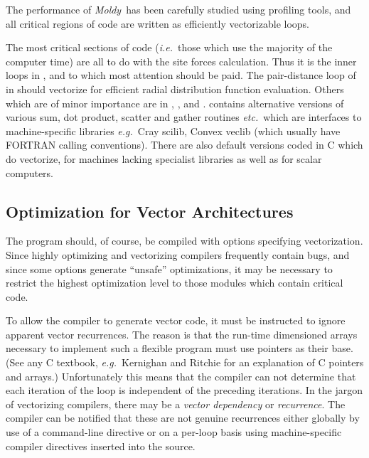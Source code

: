 \documentclass[a4paper,twoside]{report}
\newcommand{\moldy}{\emph{Moldy}}
\newcommand{\etc}{\emph{etc.}}
\newcommand{\eg}{\emph{e.g.}}
\newcommand{\ie}{\emph{i.e.}}
\begin{document}
The performance of \moldy\  has been carefully studied using profiling
tools, and all critical regions of code are written as efficiently
vectorizable loops.  

The most critical sections of code (\ie\ those which use the majority
of the computer time) are all to do with the site forces calculation.
Thus it is the inner loops in ,  and
 to which most attention should be paid.  The
pair-distance loop of  in  should
vectorize for efficient radial distribution function evaluation.
Others which are of minor importance are in ,
,  and .
 contains alternative versions of various sum, dot
product, scatter and gather routines \etc\ which are interfaces to
machine-specific libraries \eg\ Cray scilib, Convex veclib (which
usually have FORTRAN calling conventions). There are also default
versions coded in C which do vectorize, for machines lacking
specialist libraries as well as for scalar computers.

\subsection{Optimization for Vector Architectures}
The program should, of course, be compiled with options specifying
vectorization.   Since highly
optimizing and vectorizing compilers frequently contain bugs, and
since some options generate ``unsafe'' optimizations, it may be
necessary to restrict the highest optimization level to those modules
which contain critical code.

To allow the compiler to generate vector code, it must be instructed
to ignore apparent vector recurrences. The reason is that the run-time
dimensioned arrays necessary to implement such a flexible program must
use pointers as their base.  (See any C textbook, \eg\ Kernighan and
Ritchie\cite[Chapter 5]{kernighan:88} for an explanation of C pointers and
arrays.)  Unfortunately this means that the compiler can not determine
that each iteration of the loop is independent of the preceding
iterations.  In the jargon of vectorizing compilers, there may be a
\emph{vector dependency} or \emph{recurrence}. The compiler can be
notified that these are not genuine recurrences either globally by use
of a command-line directive or on a per-loop basis using
machine-specific compiler directives inserted into the source.
\end{document}
